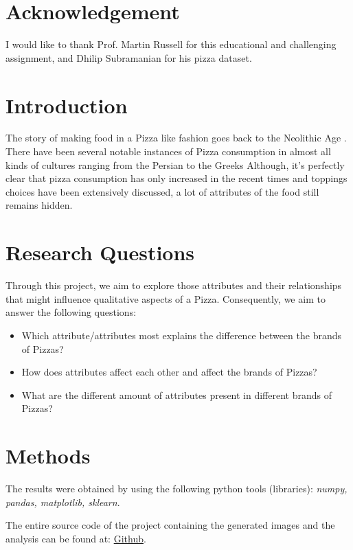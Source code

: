 \documentclass[preprint,12pt]{elsarticle}
\begin{document}
\section{Acknowledgement}
\label{s:acknowledge}
I would like to thank  Prof. Martin Russell for this educational and challenging assignment, and  Dhilip Subramanian for his pizza dataset.

\section{Introduction}
\label{s:introduction}
The story of making food in a Pizza like fashion goes back to the Neolithic Age \cite{pizzaOrigins1991}. There have been several
notable instances of Pizza consumption in almost all kinds of cultures ranging from the Persian to the Greeks \cite{Persian2014} \cite{Greek2000}
Although, it's perfectly clear that pizza consumption has only increased in the recent times and toppings choices have
been extensively discussed, a lot of attributes of the food still remains hidden.
\par
\section{Research Questions}
\label{s:ResearchQuestions}
Through this project, we aim to explore those attributes and their relationships that might influence qualitative aspects of a Pizza.
Consequently, we aim to answer the following questions:

\begin{itemize}
\item Which attribute/attributes most explains the difference between the brands of Pizzas?
\item How does attributes affect each other and affect the brands of Pizzas?
\item What are the different amount of attributes present in different brands of Pizzas?
\end{itemize}

\section{Methods}
\label{s:Methods}
The results were obtained by using the following python tools (libraries):  \textit{numpy, pandas, matplotlib, sklearn}. \cite{softwares}
\par
The entire source code of the project containing the generated images and the analysis can be found at: \href{https://github.com/amar-laksh/UNI/tree/master/assignments/IDA/assignment}{Github}.
\end{document}
